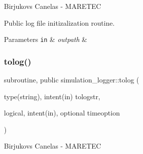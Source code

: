 Birjukovs Canelas -\/ M\+A\+R\+E\+T\+EC 

Public log file initizalization routine. 
\begin{DoxyParams}[1]{Parameters}
\mbox{\tt in}  & {\em outpath} & \\
\hline
\end{DoxyParams}
\mbox{\label{namespacesimulation__logger_a3aaa69ec168b6f34d703fb4033a22d92}} 
\subsubsection{\texorpdfstring{tolog()}{tolog()}}
{\footnotesize\ttfamily subroutine, public simulation\+\_\+logger\+::tolog (\begin{DoxyParamCaption}\item[{type(string), intent(in)}]{tologstr,  }\item[{logical, intent(in), optional}]{timeoption }\end{DoxyParamCaption})}



Birjukovs Canelas -\/ M\+A\+R\+E\+T\+EC 

